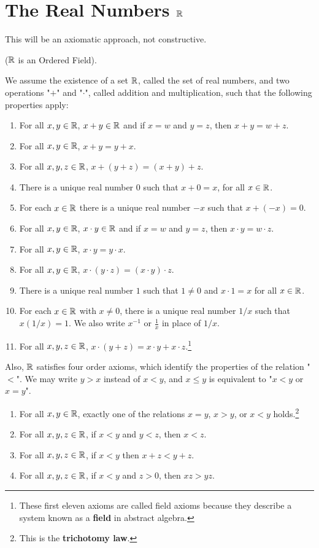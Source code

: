 \chapter{The Real Numbers $\mathbb{R}$}

This will be an axiomatic approach, not constructive.

\begin{axiom}($\mathbb{R}$ is an Ordered Field).
	

	We assume the existence of a set $\mathbb{R}$, called the set of real numbers, and two operations "$+$" and "$\cdot$", called addition and multiplication, such that the following properties apply:
	\begin{enumerate}
		\item For all $x,y\in\mathbb{R}$, $x+y\in\mathbb{R}$ and if $x=w$ and $y=z$, then $x+y=w+z$.
		\item For all $x,y\in\mathbb{R}$, $x+y=y+x$.
		\item For all $x,y,z\in\mathbb{R}$, $x+(y+z)=(x+y)+z$.
		\item There is a unique real number $0$ such that $x+0=x$, for all $x\in\mathbb{R}$.
		\item For each $x\in\mathbb{R}$ there is a unique real number $-x$ such that $x+(-x)=0$.
		\item For all $x,y\in\mathbb{R}$, $x\cdot y\in\mathbb{R}$ and if $x=w$ and $y=z$, then $x\cdot y=w\cdot z$.
		\item For all $x,y\in\mathbb{R}$, $x\cdot y=y\cdot x$.
		\item For all $x,y\in\mathbb{R}$, $x\cdot (y\cdot z)=(x\cdot y)\cdot z$.
		\item There is a unique real number $1$ such that $1\neq 0$ and $x\cdot 1=x$ for all $x\in \mathbb{R}$.
		\item For each $x\in\mathbb{R}$ with $x\neq 0$, there is a unique real number $1/x$ such that $x(1/x)=1$. We also write $x^{-1}$ or $\frac{1}{x}$ in place of $1/x$.
		\item For all $x,y,z\in\mathbb{R}$, $x\cdot (y+z)=x\cdot y + x\cdot z$.\footnote{These first eleven axioms are called field axioms because they describe a system known as a \textbf{field} in abstract algebra.}
	\end{enumerate}
	Also, $\mathbb{R}$ satisfies four order axioms, which identify the properties of the relation "$<$". We may write $y>x$ instead of $x<y$, and $x\leq y$ is equivalent to "$x<y$ or $x=y$".
	\begin{enumerate}
		\item For all $x,y\in\mathbb{R}$, exactly one of the relations $x=y$, $x>y$, or $x<y$ holds.\footnote{This is the \textbf{trichotomy law}.}
		\item For all $x,y,z\in\mathbb{R}$, if $x<y$ and $y<z$, then $x<z$.
		\item For all $x,y,z\in\mathbb{R}$, if $x<y$ then $x+z<y+z$.
		\item For all $x,y,z\in\mathbb{R}$, if $x<y$ and $z>0$, then $xz>yz$.
	\end{enumerate}
\end{axiom}

